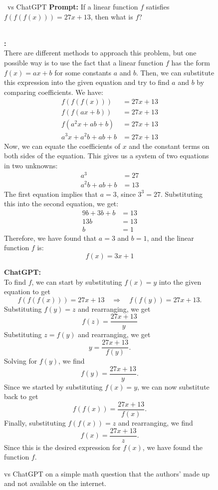 \begin{figure}[H]
\begin{AIbox}{\DV~vs ChatGPT}
{\bf Prompt:} {\scriptsize
If a linear function $f$ satisfies $f(f(f(x))) = 27x + 13$, then what is $f$?  
}\\\ \\
\parbox[t]{0.5\linewidth}{{\bf \DV:}\\
\scriptsize
There are different methods to approach this problem, but one possible way is to use the fact that a linear function $f$ has the form $f(x) = ax + b$ for some constants $a$ and $b$. Then, we can substitute this expression into the given equation and try to find $a$ and $b$ by comparing coefficients. We have:
\begin{align*} f(f(f(x))) &= 27x + 13 \\ f(f(ax + b)) &= 27x + 13 \\ f(a^2x + ab + b) &= 27x + 13 \\ a^3x + a^2b + ab + b &= 27x + 13 \end{align*}
Now, we can equate the coefficients of $x$ and the constant terms on both sides of the equation. This gives us a system of two equations in two unknowns:
\begin{align*} a^3 &= 27 \\ a^2b + ab + b &= 13 \end{align*}
The first equation implies that $a = 3$, since $3^3 = 27$. Substituting this into the second equation, we get:
\begin{align*} 9b + 3b + b &= 13 \\ 13b &= 13 \\ b &= 1 \end{align*}
Therefore, we have found that $a = 3$ and $b = 1$, and the linear function $f$ is: \[f(x) = 3x + 1\]
}\hspace{0.02\linewidth}%
\parbox[t]{0.45\linewidth}{{\bf ChatGPT:} \\
\scriptsize
To find $f$, we can start by substituting $f(x) = y$ into the given equation to get
\[f(f(f(x))) = 27x + 13 \quad \Rightarrow \quad f(f(y)) = 27x + 13.\]
Substituting $f(y) = z$ and rearranging, we get
\[f(z) = \frac{27x + 13}{y}\]
Substituting $z = f(y)$ and rearranging, we get
\[y = \frac{27x + 13}{f(y)}.\]
Solving for $f(y)$, we find
\[f(y) = \frac{27x + 13}{y}.\]
Since we started by substituting $f(x) = y$, we can now substitute back to get
\[f(f(x)) = \frac{27x + 13}{f(x)}.\]
Finally, substituting $f(f(x)) = z$ and rearranging, we find
\[f(x) = \frac{27x + 13}{z}.\]
Since this is the desired expression for $f(x)$, we have found the function $f$.
}
\end{AIbox}
\caption{\DV vs ChatGPT on a simple math question that the authors' made up and not available on the internet.}
\label{fig:code-memory-align}
\end{figure}

